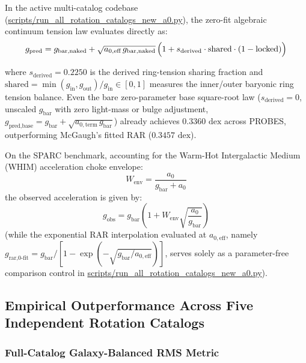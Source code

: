 \documentclass[11pt,a4paper]{article}
\begin{document}
In the active multi-catalog codebase (\url{scripts/run_all_rotation_catalogs_new_a0.py}), the zero-fit algebraic continuum tension law evaluates directly as:
\begin{equation}
g_{\text{pred}} = g_{\text{bar,naked}} + \sqrt{a_{0,\text{eff}}\,g_{\text{bar,naked}}}\,\Bigl(1 + s_{\text{derived}} \cdot \text{shared} \cdot (1 - \text{locked})\Bigr)
\label{eq:gpred_naked_active}
\end{equation}
{\sloppy
where $s_{\text{derived}} = 0.2250$ is the derived ring-tension sharing fraction and $\text{shared} = \min(g_{\text{in}}, g_{\text{out}})/\allowbreak g_{\text{in}} \in [0,1]$ measures the inner/outer baryonic ring tension balance. Even the bare zero-parameter base square-root law ($s_{\text{derived}} = 0$, unscaled $g_{\text{bar}}$ with zero light-mass or bulge adjustment, $g_{\text{pred,base}} = g_{\text{bar}} + \sqrt{a_{0,\text{term}}\,g_{\text{bar}}}$) already achieves $0.3360\text{ dex}$ across PROBES, outperforming McGaugh's fitted RAR ($0.3457\text{ dex}$).

On the SPARC benchmark, accounting for the Warm-Hot Intergalactic Medium (WHIM) acceleration choke envelope:
\begin{equation}
W_{\text{env}} = \frac{a_0}{g_{\text{bar}} + a_0}
\label{eq:w_env}
\end{equation}
the observed acceleration is given by:
\begin{equation}
g_{\text{obs}} = g_{\text{bar}} \left(1 + W_{\text{env}} \sqrt{\frac{a_0}{g_{\text{bar}}}}\right)
\label{eq:gobs_whim}
\end{equation}
(while the exponential RAR interpolation evaluated at $a_{0,\text{eff}}$, namely $g_{\text{rar,0-fit}} = g_{\text{bar}} / [1 - \exp(-\sqrt{g_{\text{bar}} / a_{0,\text{eff}}})]$, serves solely as a parameter-free comparison control in \url{scripts/run_all_rotation_catalogs_new_a0.py}).
\par}

\subsection{Empirical Outperformance Across Five Independent Rotation Catalogs}
\label{subsec:multi_catalog_sweep}

\subsubsection{Full-Catalog Galaxy-Balanced RMS Metric}
\label{subsubsec:rms_metric}
\end{document}
